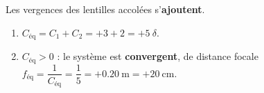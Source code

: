 \documentclass[11pt,a4paper]{article}
\begin{document}
\begin{corrige}
Les vergences des lentilles accolées s'\textbf{ajoutent}.
\begin{enumerate}[label=\alph*)]
  \item $C_{\text{éq}}=C_1+C_2=+3+2=+5~\delta$.
  \item $C_{\text{éq}}>0$ : le système est \textbf{convergent}, de distance focale
        $f_{\text{éq}}=\dfrac{1}{C_{\text{éq}}}=\dfrac{1}{5}=+\qty{0.20}{\m}=+\qty{20}{\cm}$.
\end{enumerate}
\end{corrige}
\end{document}
